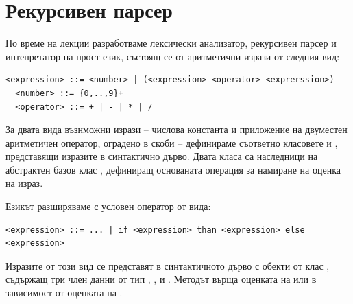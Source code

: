 \pagebreak


\section{Рекурсивен парсер}


\begin{mdframed}[hidealllines=true,backgroundcolor=gray!20]
По време на лекции разработваме лексически анализатор, рекурсивен парсер и интепретатор на прост език, състоящ се от аритметични изрази от следния вид:
\begin{flushleft}
  \begin{lstlisting}[mathescape]
  <expression> ::= <number> | (<expression> <operator> <exprerssion>)
  <number> ::= {0,..,9}+
  <operator> ::= + | - | * | /
  \end{lstlisting}
\end{flushleft}

За двата вида възнможни изрази -- числова константа и приложение на двуместен аритметичен оператор, оградено в скоби -- дефинираме съответно класовете  и , представящи изразите в синтактично дърво. Двата класа са наследници на абстрактен базов клас , дефиниращ основаната операция  за намиране на оценка на израз.

Езикът разширяваме с условен оператор от вида:
\begin{flushleft}
  \begin{lstlisting}[mathescape]
<expression> ::= ... | if <expression> than <expression> else <expression>
  \end{lstlisting}
\end{flushleft}

Изразите от този вид се представят в синтактичното дърво с обекти от клас , съдържащ три член данни от тип , ,  и . Методът  върща оценката на  или  в зависимост от оценката на .
\end{mdframed}

